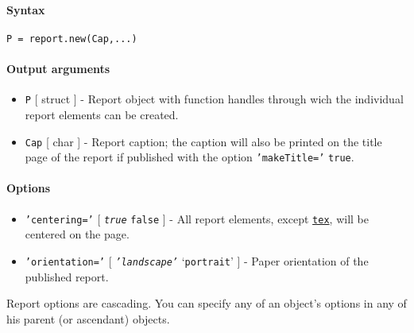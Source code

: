 


	\paragraph{Syntax}

\begin{verbatim}
P = report.new(Cap,...)
\end{verbatim}

\paragraph{Output arguments}

\begin{itemize}
\item
  \texttt{P} {[} struct {]} - Report object with function handles
  through wich the individual report elements can be created.
\item
  \texttt{Cap} {[} char {]} - Report caption; the caption will also be
  printed on the title page of the report if published with the option
  \texttt{'makeTitle='} \texttt{true}.
\end{itemize}

\paragraph{Options}

\begin{itemize}
\item
  \texttt{'centering='} {[} \emph{\texttt{true}} \textbar{}
  \texttt{false} {]} - All report elements, except
  \href{report/tex}{\texttt{tex}}, will be centered on the page.
\item
  \texttt{'orientation='} {[} \emph{\texttt{'landscape'}} \textbar{}
  `\texttt{portrait}' {]} - Paper orientation of the published report.
\end{itemize}

Report options are cascading. You can specify any of an object's options
in any of his parent (or ascendant) objects.


